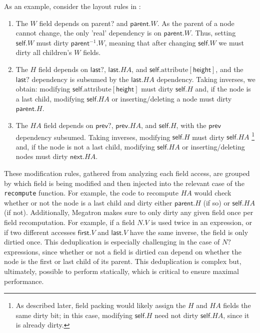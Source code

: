 As an example, consider the layout rules in :
\begin{enumerate}
\item The $W$ field depends on \textsf{parent?} and $\mathsf{parent}.W$.
As the \textsf{parent} of a node cannot change,
  the only 'real' dependency is on $\mathsf{parent}.W$.
Thus, setting $\mathsf{self}.W$ must dirty $\mathsf{parent}^{-1}.W$,
  meaning that after changing $\mathsf{self}.W$
  we must dirty all children's $W$ fields.
\item The $H$ field depends on $\mathsf{last}?$, $\mathsf{last}.HA$,
  and $\mathsf{self}.\text{attribute}[\mathsf{height}]$,
  and the $\mathsf{last}?$ dependency is subsumed by
  the $\mathsf{last}.HA$ dependency.
Taking inverses, we obtain:
  modifying $\mathsf{self}.\text{attribute}[\mathsf{height}]$
  must dirty $\mathsf{self}.H$ and,
  if the node is a last child,
  modifying $\mathsf{self}.HA$ or inserting/deleting a node
  must dirty $\mathsf{parent}.H$.
\item The $HA$ field depends on $\mathsf{prev}?$, $\mathsf{prev}.HA$, 
  and $\mathsf{self}.H$, with the $\mathsf{prev}$ dependency subsumed.
Taking inverses, 
  modifying $\mathsf{self}.H$ must dirty $\mathsf{self}.HA$%
\footnote{
As described later, field packing would likely assign
  the $H$ and $HA$ fields the same dirty bit;
  in this case, modifying $\mathsf{self}.H$
  need not dirty $\mathsf{self}.HA$, since it is already dirty.
}
  and,
  if the node is not a last child,
  modifying $\mathsf{self}.HA$ or inserting/deleting nodes
  must dirty $\mathsf{next}.HA$.
\end{enumerate}

These modification rules, gathered from analyzing each field access,
  are grouped by which field is being modified
  and then injected into the relevant case
  of the \texttt{recompute} function.
For example, the code to recompute $HA$
  would check whether or not the node is a last child
  and dirty either $\mathsf{parent}.H$ (if so)
  or $\mathsf{self}.HA$ (if not).
Additionally,
  Megatron makes sure to only dirty any given field
  once per field recomputation.
For example, if a field $N.V$ is used twice in an expression,
  or if two different accesses $\mathsf{first}.V$ and $\mathsf{last}.V$
  have the same inverse, the field is only dirtied once.
This deduplication is especially challenging
  in the case of $N?$ expressions,
  since whether or not a field is dirtied can depend
  on whether the node is the first or last child of its parent.
This deduplication is complex but, ultimately,
  possible to perform statically,
  which is critical to ensure maximal performance.

